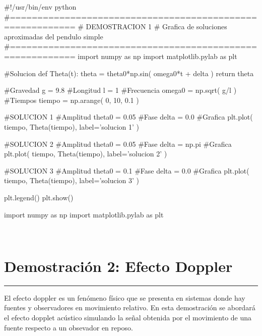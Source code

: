 \newpage
\begin{listing}[style=python]
#!/usr/bin/env python
#==========================================================
# DEMOSTRACION 1
# Grafica de soluciones aproximadas del pendulo simple
#==========================================================
import numpy as np
import matplotlib.pylab as plt

#Solucion
def Theta(t):
    theta = theta0*np.sin( omega0*t + delta )
    return theta
    
#Gravedad
g = 9.8
#Longitud
l = 1
#Frecuencia
omega0 = np.sqrt( g/l )
#Tiempos
tiempo = np.arange( 0, 10, 0.1 )
    
#SOLUCION 1
#Amplitud
theta0 = 0.05
#Fase
delta = 0.0
#Grafica
plt.plot( tiempo, Theta(tiempo), label='solucion 1' )

#SOLUCION 2
#Amplitud
theta0 = 0.05
#Fase
delta = np.pi
#Grafica
plt.plot( tiempo, Theta(tiempo), label='solucion 2' )

#SOLUCION 3
#Amplitud
theta0 = 0.1
#Fase
delta = 0.0
#Grafica
plt.plot( tiempo, Theta(tiempo), label='solucion 3' )

plt.legend()
plt.show()
\end{listing}


\begin{listing}[style=python, numbers = none]
import numpy as np
import matplotlib.pylab as plt
\end{listing}





\
\section{Demostración 2: Efecto Doppler}
\label{sec:DEMO3_02}
\rule{14cm}{0.5mm}

El efecto doppler es un fenómeno físico que se presenta en sistemas donde
hay fuentes y observadores en movimiento relativo. En esta demostración se 
abordará el efecto dopplet acústico simulando la señal obtenida por el 
movimiento de una fuente respecto a un obsevador en reposo.

